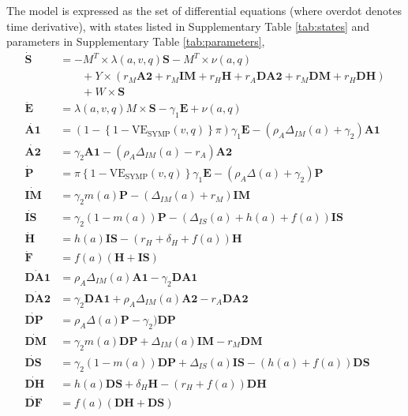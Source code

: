 \documentclass[11pt]{article}
\newcommand{\beq}{\begin{equation}}
\newcommand{\eeq}{\end{equation}}
\begin{document}
The model is expressed as the set of differential equations (where overdot denotes time derivative), with states listed in Supplementary Table \ref{tab:states} and parameters in Supplementary Table \ref{tab:parameters},
\beq
\begin{aligned}
 \dot{\mathbf{S}} & = -  M^T \times \lambda(a, v, q) \mathbf{S}  - M^T \times \nu(a,q) \\
      &\qquad + Y \times (r_M  \mathbf{A2} + r_M  \mathbf{IM}  + r_H  \mathbf{H} + r_A  \mathbf{DA2} + r_M  \mathbf{DM} + r_H  \mathbf{DH}) \\
      &\qquad + W \times \mathbf{S} \\ 
\dot{\mathbf{E} } & = \lambda(a, v, q) M \times \mathbf{S} - \gamma_1 \mathbf{E}  + \nu(a,q)\\ 
\dot{\mathbf{A1} } & = (1 - \left\{1-\mathrm{VE_{SYMP}}(v,q)\right\} \pi)\gamma_1 \mathbf{E} - (\rho_A \Delta_{IM}(a) + \gamma_2) \mathbf{A1}  \\ 
\dot{\mathbf{A2} } & = \gamma_2 \mathbf{A1} - (\rho_A  \Delta_{IM}(a) - r_A) \mathbf{A2}  \\ 
\dot{\mathbf{P} } & = \pi\left\{1-\mathrm{VE_{SYMP}}(v,q)\right\} \gamma_1 \mathbf{E}  - (\rho_A \Delta(a) + \gamma_2) \mathbf{P}   \\ 
\dot{\mathbf{IM} } & =  \gamma_2 m(a) \mathbf{P}  - (\Delta_{IM}(a)  + r_M)   \mathbf{IM}   \\
\dot{\mathbf{IS} } & =  \gamma_2 (1 - m(a)) \mathbf{P}  - (\Delta_{IS}(a) + h(a) + f(a))   \mathbf{IS}   \\
\dot{\mathbf{H} } & = h(a) \mathbf{IS}  - (r_H  + \delta_H + f(a)) \mathbf{H}   \\
\dot{\mathbf{F} } & = f(a) (\mathbf{H} + \mathbf{IS} ) \\
\dot{\mathbf{DA1} } & = \rho_A \Delta_{IM}(a)  \mathbf{A1} - \gamma_2 \mathbf{DA1}  \\ 
\dot{\mathbf{DA2} } & = \gamma_2 \mathbf{DA1} + \rho_A  \Delta_{IM}(a) \mathbf{A2} - r_A \mathbf{DA2}  \\ 
\dot{\mathbf{DP} } & = \rho_A \Delta(a) \mathbf{P} - \gamma_2) \mathbf{DP}   \\ 
\dot{\mathbf{DM} } & =  \gamma_2 m(a) \mathbf{DP}  + \Delta_{IM}(a)  \mathbf{IM}  - r_M  \mathbf{DM}   \\
\dot{\mathbf{DS} } & =  \gamma_2 (1 - m(a)) \mathbf{DP}  + \Delta_{IS}(a)  \mathbf{IS}  - ( h(a) + f(a))   \mathbf{DS}   \\
\dot{\mathbf{DH} } & = h(a) \mathbf{DS}  + \delta_H \mathbf{H} - (r_H  + f(a)) \mathbf{DH}   \\
\dot{\mathbf{DF} } & = f(a) (\mathbf{DH} + \mathbf{DS} ) \\
\end{aligned}
\label{model_ode}
\eeq
\end{document}

